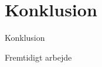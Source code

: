 \section{Konklusion}
\begin{frame}{Konklusion}
\end{frame}

\begin{frame}{Fremtidigt arbejde}
\end{frame}